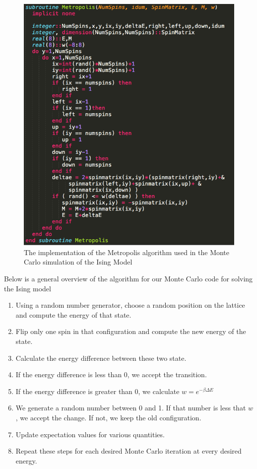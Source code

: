 \documentclass[%
oneside,                 %
final,                   %
10pt]{article}
\begin{document}
\begin{figure}[H]\label{fig:metropolis}
  \centering
    \includegraphics[width=1.0 \textwidth]{Metropolis}
    \caption{The implementation of the Metropolis algorithm used in the Monte Carlo simulation of the Ising Model}
\end{figure}

Below is a general overview of the algorithm for our Monte Carlo code for solving the Ising model

\begin{enumerate}
\item Using a random number generator, choose a random position on the lattice and compute the energy of that state.
\item Flip only one spin in that configuration and compute the new energy of the state.
\item Calculate the energy difference between these two state.
\item If the energy difference is less than 0, we accept the transition.
\item If the energy difference is greater than 0, we calculate $w=e^{-\beta \Delta E}$
\item We generate a random number between 0 and 1.  If that number is less that $w$, we accept the change.  If not, we keep the old configuration.
\item Update expectation values for various quantities.
\item Repeat these steps for each desired Monte Carlo iteration at every desired energy.
\end{enumerate}
\end{document}
